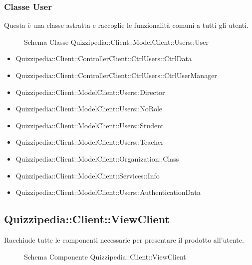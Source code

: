 \subsubsection{Classe User}
Questa è una classe astratta e raccoglie le funzionalità comuni a tutti gli utenti.
\begin{figure}[H]
\centering
\noindent{}
\caption[Schema Classe User]{Schema Classe Quizzipedia::Client::ModelClient::Users::User}
\end{figure}
\begin{itemize}
\item Quizzipedia::Client::ControllerClient::CtrlUsers::CtrlData
\item Quizzipedia::Client::ControllerClient::CtrlUsers::CtrlUserManager
\item Quizzipedia::Client::ModelClient::Users::Director
\item Quizzipedia::Client::ModelClient::Users::NoRole
\item Quizzipedia::Client::ModelClient::Users::Student
\item Quizzipedia::Client::ModelClient::Users::Teacher
\end{itemize}
\begin{itemize}
\item Quizzipedia::Client::ModelClient::Organization::Class
\item Quizzipedia::Client::ModelClient::Services::Info
\item Quizzipedia::Client::ModelClient::Users::AuthenticationData
\end{itemize}
\subsection{Quizzipedia::Client::ViewClient}
Racchiude tutte le componenti necessarie per presentare il prodotto all'utente.
\begin{figure}[H]
\centering
\noindent{}
\caption[Schema Componente Quizzipedia::Client::ViewClient]{Schema Componente Quizzipedia::Client::ViewClient}
\end{figure}
